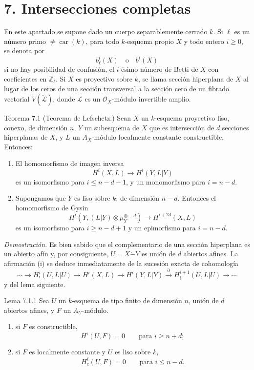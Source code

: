 \section*{7. Intersecciones completas}

En este apartado se supone dado un cuerpo separablemente cerrado $k$. Si $\ell$ es un número primo $\ne\operatorname{car}(k)$, para todo $k$-esquema propio $X$ y todo entero $i\ge0$, se denota por
\[
b_\ell^i(X)\quad\text{o}\quad b^i(X)
\]
si no hay posibilidad de confusión, el $i$-ésimo número de Betti de $X$ con coeficientes en $\mathbb Z_\ell$. Si $X$ es proyectivo sobre $k$, se llama sección hiperplana de $X$ al lugar de los ceros de una sección transversal a la sección cero de un fibrado vectorial $V(\check{\mathcal L})$, donde $\mathcal L$ es un $\mathcal O_X$-módulo invertible amplio.

\begin{statement}{Teorema 7.1}
(Teorema de Lefschetz.) Sean $X$ un $k$-esquema proyectivo liso, conexo, de dimensión $n$, $Y$ un subesquema de $X$ que es intersección de $d$ secciones hiperplanas de $X$, y $L$ un $A_X$-módulo localmente constante constructible. Entonces:
\begin{enumerate}[label=(\roman*)]
\item El homomorfismo de imagen inversa
\[
H^i(X,L)\to H^i(Y,L|Y)
\]
es un isomorfismo para $i\le n-d-1$, y un monomorfismo para $i=n-d$.
\item Supongamos que $Y$ es liso sobre $k$, de dimensión $n-d$. Entonces el homomorfismo de Gysin
\[
H^i(Y,(L|Y)\otimes\mu_Y^{\otimes -d})\to H^{i+2d}(X,L)
\]
es un isomorfismo para $i\ge n-d+1$ y un epimorfismo para $i=n-d$.
\end{enumerate}
\end{statement}

\emph{Demostración.} Es bien sabido que el complementario de una sección hiperplana es un abierto afín y, por consiguiente, $U=X\mathbin{\dot{-}}Y$ es unión de $d$ abiertos afines. La afirmación (i) se deduce inmediatamente de la sucesión exacta de cohomología
\[
\cdots\to H_!^i(U,L|U)\to H^i(X,L)\to H^i(Y,L|Y)
\xrightarrow{\partial} H_!^{i+1}(U,L|U)\to\cdots
\]
y del lema siguiente.

\begin{statement}{Lema 7.1.1}
Sea $U$ un $k$-esquema de tipo finito de dimensión $n$, unión de $d$ abiertos afines, y $F$ un $A_U$-módulo.
\begin{enumerate}[label=\alph*)]
\item si $F$ es constructible,
\[
H^i(U,F)=0\qquad\text{para }i\ge n+d;
\]
\item si $F$ es localmente constante y $U$ es liso sobre $k$,
\[
H^i_c(U,F)=0\qquad\text{para }i\le n-d.
\]
\end{enumerate}
\end{statement}
